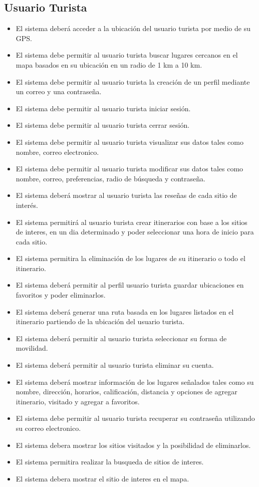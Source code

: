 \documentclass{article}
\begin{document}
\subsection{Usuario Turista}
\begin{itemize}
    \item El sistema deberá acceder a la ubicación del usuario turista por medio de su GPS.
    \item El sistema debe permitir al usuario turista buscar lugares cercanos en el mapa basados en su ubicación en un radio de 1 km a 10 km.
    \item El sistema debe permitir al usuario turista la creación de un perfil mediante un correo y una contraseña.
    \item El sistema debe permitir al usuario turista iniciar sesión.
    \item El sistema debe permitir al usuario turista cerrar sesión.
    \item El sistema debe permitir al usuario turista visualizar sus datos tales como nombre, correo electronico. 
    \item El sistema debe permitir al usuario turista modificar sus datos tales como nombre, correo, preferencias, radio de búsqueda y contraseña.
    \item El sistema deberá mostrar al usuario turista las reseñas de cada sitio de interés.
    \item El sistema permitirá al usuario turista crear itinerarios con base a los sitios de interes, en un dia determinado y poder seleccionar una hora de inicio para cada sitio.
    \item El sistema permitira la eliminación de los lugares de su itinerario o todo el itinerario.
    \item El sistema deberá permitir al perfil usuario turista guardar ubicaciones en favoritos y poder eliminarlos.
    \item El sistema deberá generar una ruta basada en los lugares listados en el itinerario partiendo de la ubicación del usuario turista.
    \item El sistema deberá permitir al usuario turista seleccionar su forma de movilidad.
    \item El sistema deberá permitir al usuario turista eliminar su cuenta.
    \item El sistema deberá mostrar información de los lugares señalados tales como su nombre, dirección, horarios, calificación, distancia y opciones de agregar itinerario, visitado y agregar a favoritos.
    \item El sistema debe permitir al usuario turista recuperar su contraseña utilizando su correo electronico.
    \item El sistema debera mostrar los sitios visitados y la posibilidad de eliminarlos.
    \item El sistema permitira realizar la busqueda de sitios de interes.
    \item El sistema debera mostrar el sitio de interes en el mapa.
    

\end{itemize}
\end{document}
